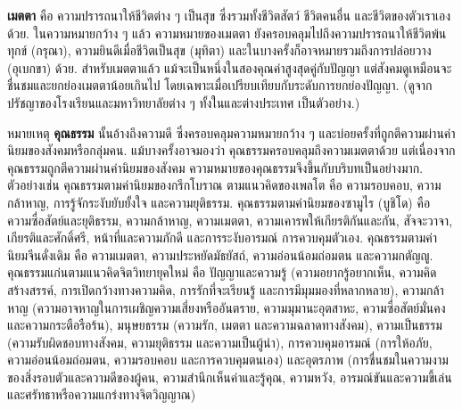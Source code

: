{\begin{shaded}
		\textbf{เมตตา} คือ ความปรารถนาให้ชีวิตต่าง ๆ เป็นสุข ซึ่งรวมทั้งชีวิตสัตว์ ชีวิตคนอื่น และชีวิตของตัวเราเองด้วย. ในความหมายกว้าง ๆ แล้ว ความหมายของเมตตา ยังครอบคลุมไปถึงความปรารถนาให้ชีวิตพ้นทุกข์ (กรุณา), ความยินดีเมื่อชีวิตเป็นสุข (มุทิตา) และในบางครั้งก็อาจหมายรวมถึงการปล่อยวาง (อุเบกขา) ด้วย.
		สำหรับเมตตาแล้ว แม้จะเป็นหนึ่งในสองคุณค่าสูงสุดคู่กับปัญญา 
		แต่สังคมดูเหมือนจะชื่นชมและยกย่องเมตตาน้อยเกินไป โดยเฉพาะเมื่อเปรียบเทียบกับระดับการยกย่องปัญญา. 
		(ดูจากปรัชญาของโรงเรียนและมหาวิทยาลัยต่าง ๆ ทั้งในและต่างประเทศ เป็นตัวอย่าง.)
		
		หมายเหตุ
\textbf{คุณธรรม} นั้นอ้างถึงความดี ซึ่งครอบคลุมความหมายกว้าง ๆ และบ่อยครั้งที่ถูกตีความผ่านค่านิยมของสังคมหรือกลุ่มคน.
แม้บางครั้งอาจมองว่า คุณธรรมครอบคลุมถึงความเมตตาด้วย 
แต่เนื่องจากคุณธรรมถูกตีความผ่านค่านิยมของสังคม 
ความหมายของคุณธรรมจึงขึ้นกับบริบทเป็นอย่างมาก. 
ตัวอย่างเช่น\cite{Wikipedia, VIA} 
คุณธรรมตามค่านิยมของกรีกโบราณ ตามแนวคิดของเพลโต คือ ความรอบคอบ, ความกล้าหาญ, การรู้จักระงับยับยั้งใจ และความยุติธรรม.
คุณธรรมตามค่านิยมของซามูไร (บูชิโด) คือ ความซื่อสัตย์และยุติธรรม, ความกล้าหาญ, ความเมตตา, ความเคารพให้เกียรติกันและกัน, สัจจะวาจา, เกียรติและศักดิ์ศรี, หน้าที่และความภักดี และการระงับอารมณ์ การควบคุมตัวเอง.
%
%
%
%
คุณธรรมตามค่านิยมจีนดั่งเดิม คือ 
ความเมตตา, ความประหยัดมัธยัสถ์, ความอ่อนน้อมถ่อมตน และความกตัญญู.
%
คุณธรรมแก่นตามแนวคิดจิตวิทยายุคใหม่
คือ ปัญญาและความรู้ (ความอยากรู้อยากเห็น, ความคิดสร้างสรรค์, การเปิดกว้างทางความคิด, การรักที่จะเรียนรู้ และการมีมุมมองที่หลากหลาย),
ความกล้าหาญ (ความอาจหาญในการเผชิญความเสี่ยงหรืออันตราย, ความมุมานะอุตสาหะ, ความซื่อสัตย์มั่นคง และความกระตือรือร้น),
มนุษยธรรม (ความรัก, เมตตา และความฉลาดทางสังคม),
ความเป็นธรรม (ความรับผิดชอบทางสังคม, ความยุติธรรม และความเป็นผู้นำ),
การควบคุมอารมณ์ (การให้อภัย, ความอ่อนน้อมถ่อมตน, ความรอบคอบ และการควบคุมตนเอง)
และอุตรภาพ (การชื่นชมในความงามของสิ่งรอบตัวและความดีของผู้คน, ความสำนึกเห็นค่าและรู้คุณ, ความหวัง, อารมณ์ขันและความขี้เล่น
และศรัทธาหรือความแกร่งทางจิตวิญญาณ)


\end{shaded}}
